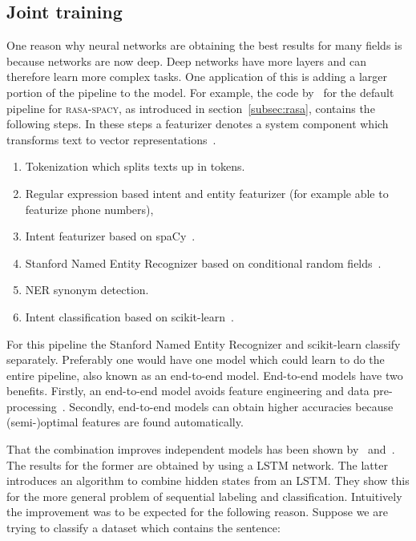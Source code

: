 \subsection{Joint training}
\label{subsec:joint_training}
One reason why neural networks are obtaining the best results for many fields is because networks are now deep.
Deep networks have more layers and can therefore learn more complex tasks.
One application of this is adding a larger portion of the pipeline to the model.
For example, the code by~\citet{rasa2018config} for the default pipeline for \textsc{rasa-spacy}, as introduced in section~\ref{subsec:rasa}, contains the following steps.
In these steps a featurizer denotes a system component which transforms text to vector representations~\citep{brutlag2000challenges}.
\begin{enumerate}
    \item Tokenization which splits texts up in tokens.
    \item Regular expression based intent and entity featurizer (for example able to featurize phone numbers),
    \item Intent featurizer based on spaCy~\citep{spacy2019}.
    \item Stanford Named Entity Recognizer based on conditional random fields~\citep{finkel2005incorporating}.
    \item NER synonym detection.
    \item Intent classification based on scikit-learn~\citep{scikit2019}.
\end{enumerate}

For this pipeline the Stanford Named Entity Recognizer and scikit-learn classify separately.
Preferably one would have one model which could learn to do the entire pipeline, also known as an end-to-end model.
End-to-end models have two benefits.
Firstly, an end-to-end model avoids feature engineering and data pre-processing~\citep{ma2016end}.
Secondly, end-to-end models can obtain higher accuracies because (semi-)optimal features are found automatically.

That the combination improves independent models has been shown by~\citet{ma2017jointly} and~\citet{zhang2018joint}.
The results for the former are obtained by using a LSTM network.
The latter introduces an algorithm to combine hidden states from an LSTM.
They show this for the more general problem of sequential labeling and classification.
Intuitively the improvement was to be expected for the following reason.
Suppose we are trying to classify a dataset which contains the sentence:

